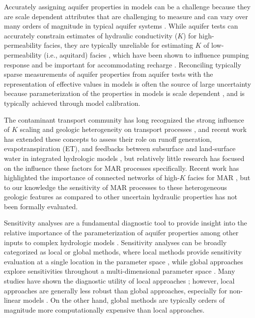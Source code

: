 Accurately assigning aquifer properties in models can be a challenge because they are scale dependent attributes that are challenging to measure and can vary over many orders of magnitude in typical aquifer systems \citep[e.g.,][]{sudicky1986natural,gelhar1992critical,weissmann1999multi}. While aquifer tests can accurately constrain estimates of hydraulic conductivity ($K$) for high-permeability facies, they are typically unreliable for estimating $K$ of low-permeability (i.e.,  aquitard) facies \citep{fogg1986groundwater,fogg1998geologically}, which have been shown to influence pumping response \citep{fogg2000connected} and be important for accommodating recharge \citep{maples_2019}.
Reconciling typically sparse measurements of aquifer properties from aquifer tests with the representation of effective values in models is often the source of large uncertainty because parameterization of the properties in models is scale dependent \citep{sudicky1991contaminant}, and is typically achieved through model calibration.

The contaminant transport community has long recognized the strong influence of $K$ scaling and geologic heterogeneity on transport processes \citep[e.g.,][]{gelhar1992critical,sudicky1991contaminant,koltermann1996heterogeneity}, and recent work has extended these concepts to assess their role on runoff generation, evapotranspiration (ET), and feedbacks between subsurface and land-surface water in integrated hydrologic models \citep{srivastava2014insights,gilbert2016global,foster2019sensitivity}, but relatively little research has focused on the influence these factors for MAR processes specifically. Recent work has highlighted the importance of connected networks of high-$K$ facies for MAR \citep{maples_2019}, but to our knowledge the sensitivity of MAR processes to these heterogeneous geologic features as compared to other uncertain hydraulic properties has not been formally evaluated. 

Sensitivity analyses are a fundamental diagnostic tool to provide insight into the relative importance of the parameterization of aquifer properties among other inputs to complex hydrologic models \citep{saltelli2004sensitivity}. Sensitivity analyses can be broadly categorized as local or global methods, where local methods provide sensitivity evaluation at a single location in the parameter space \citep{hill2007effective}, while global approaches explore sensitivities throughout a multi-dimensional parameter space \citep{saltelli2008global}. Many studies have shown the diagnostic utility of local approaches \citep[e.g.,][]{foglia2009sensitivity}; however, local approaches are generally less robust than global approaches, especially for non-linear models \citep{saltelli2008global}. On the other hand, global methods are typically orders of magnitude more computationally expensive than local approaches.

